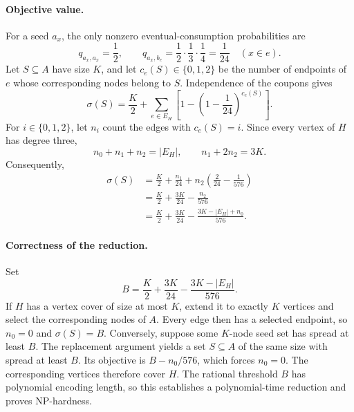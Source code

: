 \documentclass[sigconf]{acmart}
\begin{document}
\paragraph{Objective value.}
For a seed $a_x$, the only nonzero eventual-consumption probabilities
are
\[
  q_{a_x,a_x}=\frac12,\qquad
  q_{a_x,b_e}=\frac12\cdot\frac13\cdot\frac14=\frac1{24}
  \quad(x\in e).
\]
Let $S\subseteq A$ have size $K$, and let $c_e(S)\in\{0,1,2\}$ be
the number of endpoints of $e$ whose corresponding nodes belong to
$S$. Independence of the coupons gives
\[
  \sigma(S)=\frac K2+
    \sum_{e\in E_H}\left[1-\left(1-\frac1{24}\right)^{c_e(S)}\right].
\]
For $i\in\{0,1,2\}$, let $n_i$ count the edges with $c_e(S)=i$.
Since every vertex of $H$ has degree three,
\[
  n_0+n_1+n_2=|E_H|,\qquad n_1+2n_2=3K.
\]
Consequently,
\begin{align*}
  \sigma(S)
    &=\frac K2+\frac{n_1}{24}
      +n_2\left(\frac2{24}-\frac1{576}\right)\\
    &=\frac K2+\frac{3K}{24}-\frac{n_2}{576}\\
    &=\frac K2+\frac{3K}{24}
      -\frac{3K-|E_H|+n_0}{576}.
\end{align*}

\paragraph{Correctness of the reduction.}
Set
\[
  B=\frac K2+\frac{3K}{24}-\frac{3K-|E_H|}{576}.
\]
If $H$ has a vertex cover of size at most $K$, extend it to exactly
$K$ vertices and select the corresponding nodes of $A$. Every edge
then has a selected endpoint, so $n_0=0$ and $\sigma(S)=B$.
Conversely, suppose some $K$-node seed set has spread at least $B$.
The replacement argument yields a set $S\subseteq A$ of the same
size with spread at least $B$. Its objective is $B-n_0/576$, which
forces $n_0=0$. The corresponding vertices therefore cover $H$.
The rational threshold $B$ has polynomial encoding length, so this
establishes a polynomial-time reduction and proves NP-hardness.
\end{document}
